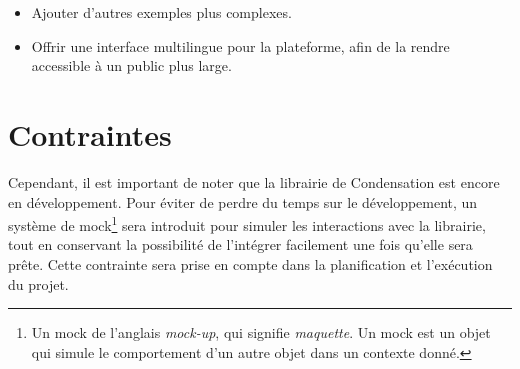 \begin{itemize}
    \item Ajouter d’autres exemples plus complexes.
    \item Offrir une interface multilingue pour la plateforme, afin de la rendre accessible à un public plus large.
\end{itemize}

\section*{Contraintes}
Cependant, il est important de noter que la librairie de Condensation est encore en développement. Pour éviter de perdre du temps sur le développement, un système de mock\footnote{Un mock de l'anglais \textit{mock-up}, qui signifie \textit{maquette}. Un mock est un objet qui simule le comportement d'un autre objet dans un contexte donné.} sera introduit pour simuler les interactions avec la librairie, tout en conservant la possibilité de l'intégrer facilement une fois qu'elle sera prête. Cette contrainte sera prise en compte dans la planification et l'exécution du projet.